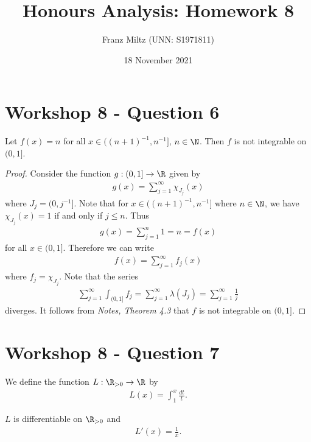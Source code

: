 \documentclass{article}
\begin{document}
\title{Honours Analysis: Homework 8}
\author{Franz Miltz (UNN: S1971811)}
\date{18 November 2021}
\maketitle

\section*{Workshop 8 - Question 6}

\begin{claim*}
   Let $f(x)=n$ for all $x\in((n+1)^{-1}, n^{-1}]$, $n\in\N$. Then $f$ is not integrable on 
   $(0,1]$.
\end{claim*}
\begin{proof}
   Consider the function $g:(0,1]\to\R$ given by 
   \begin{align*}
      g(x) = \sum_{j=1}^\infty \chi_{J_j}(x)
   \end{align*}
   where $J_j = (0, j^{-1}]$. Note that for $x\in((n+1)^{-1}, n^{-1}]$ where $n\in\N$,
   we have $\chi_{J_j}(x)=1$ if and only if $j\leq n$. Thus 
   \begin{align*}
      g(x) = \sum_{j=1}^n 1 = n = f(x)
   \end{align*}
   for all $x\in(0,1]$. Therefore we can write 
   \begin{align*}
      f(x) = \sum_{j=1}^\infty f_j(x)
   \end{align*}
   where $f_j=\chi_{J_j}$. Note that the series 
   \begin{align*}
      \sum_{j=1}^\infty \int_{(0,1]} f_j = \sum_{j=1}^\infty \lambda(J_j)  
      = \sum_{j=1}^\infty \frac{1}{j}
   \end{align*}
   diverges. It follows from \emph{Notes, Theorem 4.3} that $f$ is not integrable on $(0,1]$. 
\end{proof}

\section*{Workshop 8 - Question 7}

We define the function $L:\R_{>0}\to\R$ by
\begin{align*}
   L(x) = \int_1^x \frac{dt}{t}.
\end{align*}

\begin{claim*}
   $L$ is differentiable on $\R_{>0}$ and
   \begin{align}
      \label{deriv}
      L'(x) = \frac{1}{x}.
   \end{align}
\end{claim*}
\end{document}
